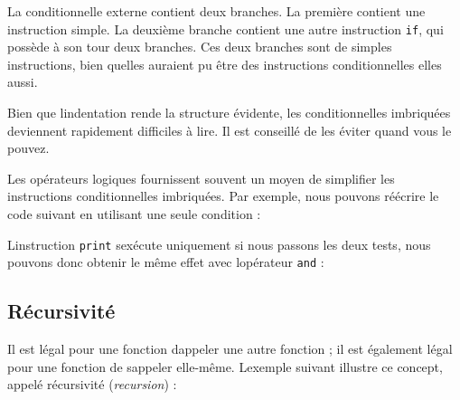 La conditionnelle externe contient deux branches. La première contient
une instruction simple. La deuxième branche contient une autre
instruction \texttt{if}, qui possède à son tour deux branches. Ces deux
branches sont de simples instructions, bien qu\textquotesingle elles
auraient pu être des instructions conditionnelles elles aussi.

Bien que l\textquotesingle indentation rende la structure évidente, les
conditionnelles imbriquées deviennent rapidement difficiles à lire. Il
est conseillé de les éviter quand vous le pouvez.

Les opérateurs logiques fournissent souvent un moyen de simplifier les
instructions conditionnelles imbriquées. Par exemple, nous pouvons
réécrire le code suivant en utilisant une seule condition :

\begin{Shaded}
\begin{Highlighting}[]
  \OperatorTok{\textless{}}
    \OperatorTok{\textless{}} \NormalTok{:}
        \NormalTok{(}\NormalTok{)}
\end{Highlighting}
\end{Shaded}

L\textquotesingle instruction \texttt{print} s\textquotesingle exécute
uniquement si nous passons les deux tests, nous pouvons donc obtenir le
même effet avec l\textquotesingle opérateur \texttt{and} :

\begin{Shaded}
\begin{Highlighting}[]
  \OperatorTok{\textless{}}\OperatorTok{\textless{}} \NormalTok{:}
    \NormalTok{(}\NormalTok{)}
\end{Highlighting}
\end{Shaded}

\hypertarget{ruxe9cursivituxe9}{%
\subsection{Récursivité}\label{ruxe9cursivituxe9}}

Il est légal pour une fonction d\textquotesingle appeler une autre
fonction ; il est également légal pour une fonction de
s\textquotesingle appeler elle-même. L\textquotesingle exemple suivant
illustre ce concept, appelé récursivité (\emph{recursion}) :

